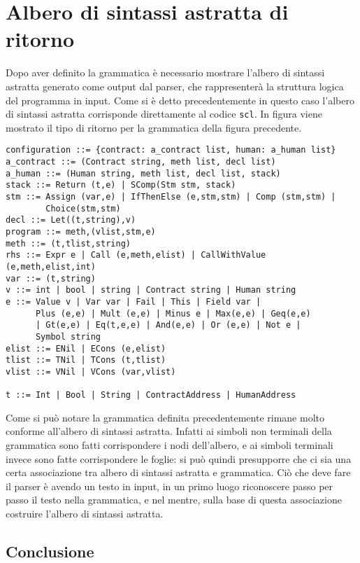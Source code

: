 \documentclass[]{article}
\begin{document}
\hypertarget{albero-di-sintassi-astratta-di-ritorno}{%
\section{Albero di sintassi astratta di
ritorno}\label{albero-di-sintassi-astratta-di-ritorno}}

Dopo aver definito la grammatica è necessario mostrare l'albero di
sintassi astratta generato come output dal parser, che rappresenterà la
struttura logica del programma in input. Come si è detto precedentemente
in questo caso l'albero di sintassi astratta corrisponde direttamente al
codice \texttt{scl}. In figura viene mostrato il tipo di ritorno per la
grammatica della figura precedente.

\begin{verbatim}
configuration ::= {contract: a_contract list, human: a_human list}
a_contract ::= (Contract string, meth list, decl list)
a_human ::= (Human string, meth list, decl list, stack)
stack ::= Return (t,e) | SComp(Stm stm, stack)
stm ::= Assign (var,e) | IfThenElse (e,stm,stm) | Comp (stm,stm) |
        Choice(stm,stm)
decl ::= Let((t,string),v)
program ::= meth,(vlist,stm,e)
meth ::= (t,tlist,string)
rhs ::= Expr e | Call (e,meth,elist) | CallWithValue (e,meth,elist,int)
var ::= (t,string)
v ::= int | bool | string | Contract string | Human string
e ::= Value v | Var var | Fail | This | Field var |
      Plus (e,e) | Mult (e,e) | Minus e | Max(e,e) | Geq(e,e)
      | Gt(e,e) | Eq(t,e,e) | And(e,e) | Or (e,e) | Not e |
      Symbol string
elist ::= ENil | ECons (e,elist)
tlist ::= TNil | TCons (t,tlist)
vlist ::= VNil | VCons (var,vlist)

t ::= Int | Bool | String | ContractAddress | HumanAddress
\end{verbatim}

Come si può notare la grammatica definita precedentemente rimane molto
conforme all'albero di sintassi astratta. Infatti ai simboli non
terminali della grammatica sono fatti corrispondere i nodi dell'albero,
e ai simboli terminali invece sono fatte corrispondere le foglie: si può
quindi presupporre che ci sia una certa associazione tra albero di
sintassi astratta e grammatica. Ciò che deve fare il parser è avendo un
testo in input, in un primo luogo riconoscere passo per passo il testo
nella grammatica, e nel mentre, sulla base di questa associazione
costruire l'albero di sintassi astratta.

\hypertarget{conclusione-1}{%
\subsection{Conclusione}\label{conclusione-1}}
\end{document}
